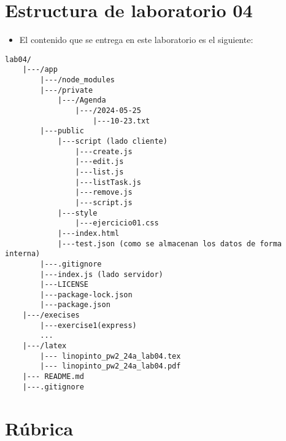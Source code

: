 \documentclass{article}
\newcommand{\itemPracticeNumber}{04}
\begin{document}
\section{Estructura de laboratorio \itemPracticeNumber}
\begin{itemize}
	\item El contenido que se entrega en este laboratorio es el siguiente:
\end{itemize}
\begin{lstlisting}[style=ascii-tree]
lab04/
    |---/app
        |---/node_modules
        |---/private
            |---/Agenda
                |---/2024-05-25
                    |---10-23.txt
        |---public
            |---script (lado cliente)
                |---create.js
                |---edit.js
                |---list.js
                |---listTask.js
                |---remove.js
                |---script.js
            |---style 
                |---ejercicio01.css
            |---index.html
            |---test.json (como se almacenan los datos de forma interna)
        |---.gitignore
        |---index.js (lado servidor)
        |---LICENSE
        |---package-lock.json
        |---package.json
    |---/execises
        |---exercise1(express)
        ...
    |---/latex
        |--- linopinto_pw2_24a_lab04.tex
        |--- linopinto_pw2_24a_lab04.pdf
    |--- README.md
    |---.gitignore
\end{lstlisting}
\section{Rúbrica}
\end{document}
